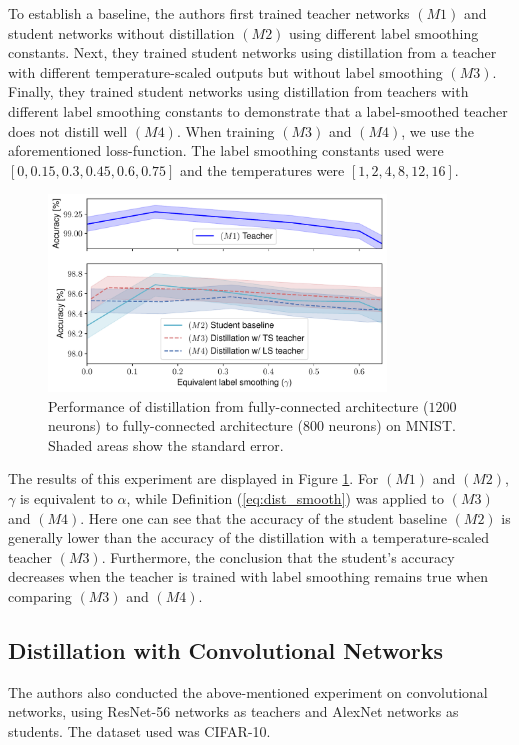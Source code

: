 To establish a baseline, the authors first trained teacher networks $(M1)$ and student networks without distillation $(M2)$ using different label smoothing constants. Next, they trained student networks using distillation from a teacher with different temperature-scaled outputs but without label smoothing $(M3)$. Finally, they trained student networks using distillation from teachers with different label smoothing constants to demonstrate that a label-smoothed teacher does not distill well $(M4)$. When training $(M3)$ and $(M4)$, we use the aforementioned loss-function. The label smoothing constants used were $[0,0.15,0.3,0.45,0.6,0.75]$ and the temperatures were $[1, 2, 4, 8, 12, 16]$.
\begin{figure}[ht]
\centering
\includegraphics[width=0.8\textwidth]{figures/fc_knowledge_distillation.pdf}
\caption{Performance of distillation from fully-connected architecture ($1200$ neurons) to fully-connected architecture ($800$ neurons) on MNIST. Shaded areas show the standard error.}
\label{fig:fc_dist}
\end{figure}

The results of this experiment are displayed in Figure \ref{fig:fc_dist}. For $(M1)$ and $(M2)$, $\gamma$ is equivalent to $\alpha$, while Definition (\ref{eq:dist_smooth}) was applied to $(M3)$ and $(M4)$. Here one can see that the accuracy of the student baseline $(M2)$ is generally lower than the accuracy of the distillation with a temperature-scaled teacher $(M3)$. Furthermore, the conclusion that the student's accuracy decreases when the teacher is trained with label smoothing remains true when comparing $(M3)$ and $(M4)$.

\subsection{Distillation with Convolutional Networks}
The authors also conducted the above-mentioned experiment on convolutional networks, using ResNet-56 networks as teachers and AlexNet networks as students. The dataset used was CIFAR-10.

